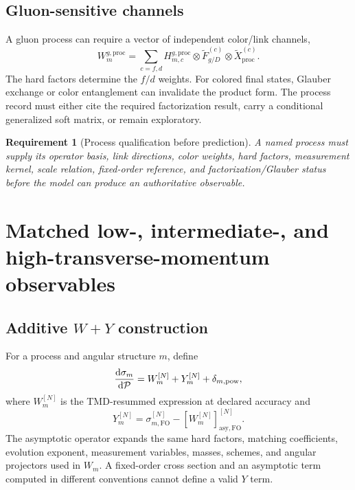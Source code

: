 \documentclass[11pt]{article}
\newtheorem{requirement}[definition]{Requirement}
\newcommand{\dd}{\mathrm{d}}
\newcommand{\cP}{\mathcal P}
\newcommand{\FO}{\mathrm{FO}}
\newcommand{\asy}{\mathrm{asy}}
\newcommand{\proc}{\mathrm{proc}}
\begin{document}
\subsection{Gluon-sensitive channels}

A gluon process can require a vector of independent color/link channels,
\begin{equation}
 W_m^{g,\proc}
 =
 \sum_{c=f,d}
 H_{m,c}^{g,\proc}
 \otimes
 \widetilde F_{g/D}^{(c)}
 \otimes
 \widetilde X_{\proc}^{(c)}.
 \label{eq:gluon-color-process-map}
\end{equation}
The hard factors determine the \(f/d\) weights.  For colored final states,
Glauber exchange or color entanglement can invalidate the product form.  The
process record must either cite the required factorization result, carry a
conditional generalized soft matrix, or remain exploratory.

\begin{requirement}[Process qualification before prediction]
A named process must supply its operator basis, link directions, color
weights, hard factors, measurement kernel, scale relation, fixed-order
reference, and factorization/Glauber status before the model can produce an
authoritative observable.
\end{requirement}


\section{Matched low-, intermediate-, and high-transverse-momentum observables}
\label{sec:wy}

\subsection{Additive \texorpdfstring{\(W+Y\)}{W+Y} construction}

For a process and angular structure \(m\), define
\begin{equation}
 \frac{\dd\sigma_m}{\dd\cP}
 =W_m^{[N]}+Y_m^{[N]}+\delta_{m,\rm pow},
 \label{eq:wy-master}
\end{equation}
where \(W_m^{[N]}\) is the TMD-resummed expression at declared accuracy and
\begin{equation}
 Y_m^{[N]}
 =
 \sigma_{m,\FO}^{[N]}
 -\left[W_m^{[N]}\right]_{\asy,\FO}^{[N]}.
 \label{eq:y-definition}
\end{equation}
The asymptotic operator expands the same hard factors, matching coefficients,
evolution exponent, measurement variables, masses, schemes, and angular
projectors used in \(W_m\).  A fixed-order cross section and an asymptotic
term computed in different conventions cannot define a valid \(Y\) term.
\end{document}
